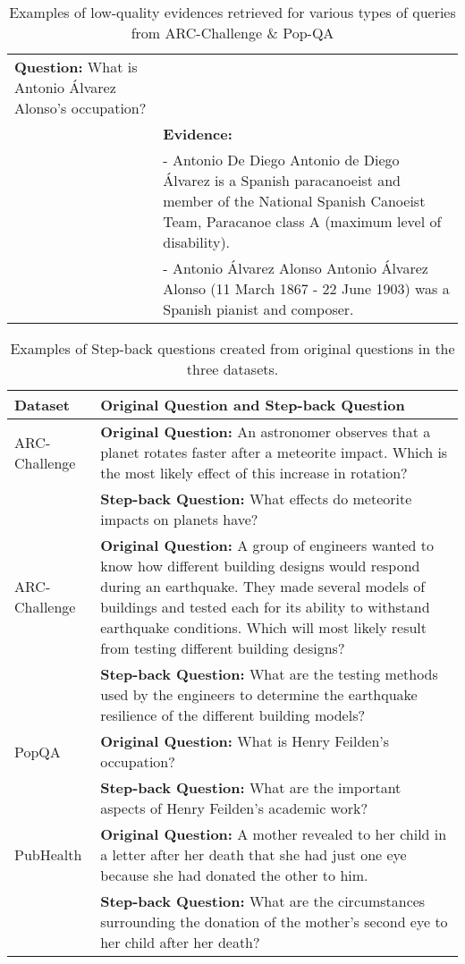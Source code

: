 \begin{table*}[t]
\begin{tabularx}{\textwidth}{lX}
\textbf{Question:} What is Antonio Álvarez Alonso's occupation?\\[1ex]
& \textbf{Evidence:}\\
& \quad - Antonio De Diego  Antonio de Diego Álvarez is a Spanish paracanoeist and member of the National Spanish Canoeist Team, Paracanoe class A (maximum level of disability).\\[0.5ex]
& \quad - Antonio Álvarez Alonso  Antonio Álvarez Alonso (11 March 1867 - 22 June 1903) was a Spanish pianist and composer.\\[0.5ex]
\bottomrule
\end{tabularx}
\caption{Examples of low-quality evidences retrieved for various types of queries from ARC-Challenge \& Pop-QA}
\label{tab:low_quality_evidences}
\end{table*}

\begin{table*}[t]
\centering
\footnotesize
\begin{tabularx}{\textwidth}{lX}
\toprule
\textbf{Dataset} & \textbf{Original Question and Step-back Question} \\
\midrule
ARC-Challenge &
\textbf{Original Question:} An astronomer observes that a planet rotates faster after a meteorite impact. Which is the most likely effect of this increase in rotation?\\[1ex]
& \textbf{Step-back Question:} What effects do meteorite impacts on planets have?\\[1ex]
ARC-Challenge &
\textbf{Original Question:} A group of engineers wanted to know how different building designs would respond during an earthquake. They made several models of buildings and tested each for its ability to withstand earthquake conditions. Which will most likely result from testing different building designs?\\[1ex]
& \textbf{Step-back Question:} What are the testing methods used by the engineers to determine the earthquake resilience of the different building models?\\[1ex]
PopQA &
\textbf{Original Question:} What is Henry Feilden's occupation?\\[1ex]
& \textbf{Step-back Question:} What are the important aspects of Henry Feilden's academic work?\\[1ex]
PubHealth &
\textbf{Original Question:} A mother revealed to her child in a letter after her death that she had just one eye because she had donated the other to him.\\[1ex]
& \textbf{Step-back Question:} What are the circumstances surrounding the donation of the mother's second eye to her child after her death?\\
\bottomrule
\end{tabularx}
\caption{Examples of Step-back questions created from original questions in the three datasets.}
\label{tab:stepback-examples}
\end{table*}


